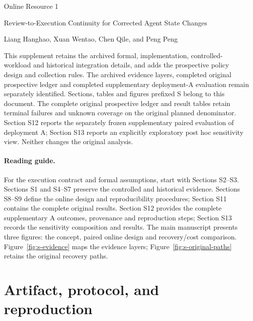 \documentclass[11pt,a4paper]{article}
\begin{document}
\begin{center}
{\Large Online Resource 1}\par\medskip
{\large Review-to-Execution Continuity for Corrected Agent State Changes}\par\medskip
Liang Hanghao, Xuan Wentao, Chen Qile, and Peng Peng
\par{}
\end{center}

This supplement retains the archived formal, implementation, controlled-workload and historical integration details, and adds the prospective policy design and collection rules. The archived evidence layers, completed original prospective ledger and completed supplementary deployment-A evaluation remain separately identified. Sections, tables and figures prefixed S belong to this document. The complete original prospective ledger and result tables retain terminal failures and unknown coverage on the original planned denominator. Section S12 reports the separately frozen supplementary paired evaluation of deployment A; Section S13 reports an explicitly exploratory post hoc sensitivity view. Neither changes the original analysis.

\paragraph{Reading guide.} For the execution contract and formal assumptions, start with Sections S2--S3. Sections S1 and S4--S7 preserve the controlled and historical evidence. Sections S8--S9 define the online design and reproducibility procedures; Section S11 contains the complete original results. Section S12 provides the complete supplementary A outcomes, provenance and reproduction steps; Section S13 records the sensitivity composition and results. The main manuscript presents three figures: the concept, paired online design and recovery/cost comparison. Figure~\ref{fig:s-evidence} maps the evidence layers; Figure~\ref{fig:s-original-paths} retains the original recovery paths.

\section{Artifact, protocol, and reproduction}
\label{app:artifact}
\end{document}
